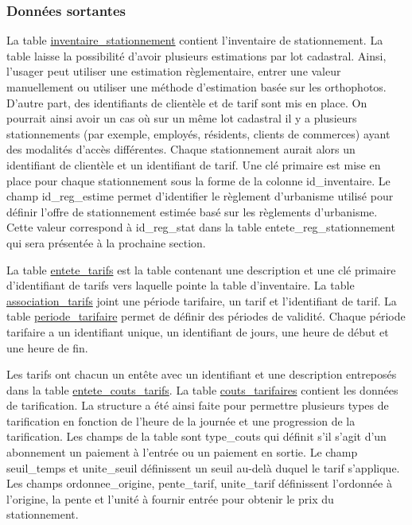     \subsubsection{Données sortantes}
    La table \underline{inventaire\_stationnement} contient l'inventaire de stationnement. La table laisse la possibilité d'avoir plusieurs estimations par lot cadastral. Ainsi, l'usager peut utiliser une estimation règlementaire, entrer une valeur manuellement ou utiliser une méthode d'estimation basée sur les orthophotos. D'autre part, des identifiants de clientèle et de tarif sont mis en place. On pourrait ainsi avoir un cas où sur un même lot cadastral il y a plusieurs stationnements (par exemple, employés, résidents, clients de commerces) ayant des modalités d'accès différentes. Chaque stationnement aurait alors un identifiant de clientèle et un identifiant de tarif. Une clé primaire est mise en place pour chaque stationnement sous la forme de la colonne id\_inventaire. Le champ id\_reg\_estime permet d'identifier le règlement d'urbanisme utilisé pour définir l'offre de stationnement estimée basé sur les règlements d'urbanisme. Cette valeur correspond à id\_reg\_stat dans la table entete\_reg\_stationnement qui sera présentée à la prochaine section.\par
    La table \underline{entete\_tarifs} est la table contenant une description et une clé primaire d'identifiant de tarifs vers laquelle pointe la table d’inventaire. La table \underline{association\_tarifs} joint une période tarifaire, un tarif et l'identifiant de tarif. La table \underline{periode\_tarifaire} permet de définir des périodes de validité. Chaque période tarifaire a un identifiant unique, un identifiant de jours, une heure de début et une heure de fin. \par
    Les tarifs ont chacun un entête avec un identifiant et une description entreposés dans la table \underline{entete\_couts\_tarifs}. La table \underline{couts\_tarifaires} contient les données de tarification. La structure a été ainsi faite pour permettre plusieurs types de tarification en fonction de l'heure de la journée et une progression de la tarification. Les champs de la table sont type\_couts qui définit s'il s'agit d'un abonnement un paiement à l'entrée ou un paiement en sortie. Le champ seuil\_temps et unite\_seuil définissent un seuil au-delà duquel le tarif s'applique. Les champs ordonnee\_origine, pente\_tarif, unite\_tarif définissent l'ordonnée à l'origine, la pente et l'unité à fournir entrée pour obtenir le prix du stationnement.\par
